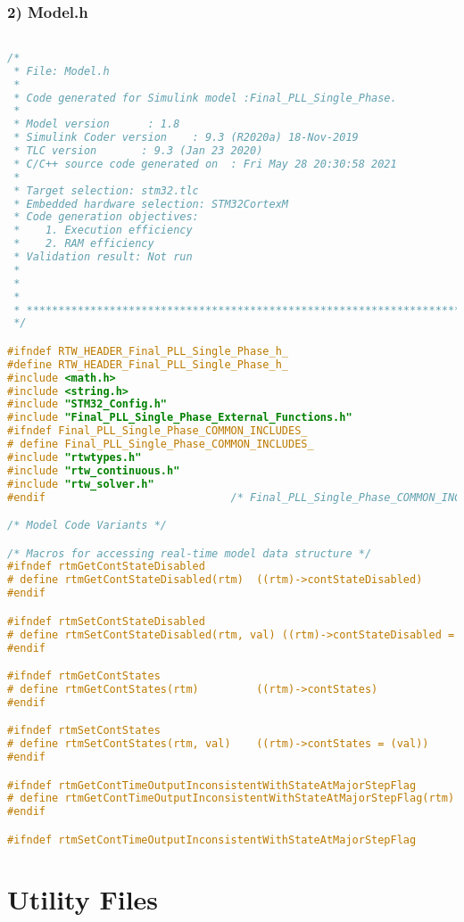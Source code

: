 \subsubsection{2) Model.h}
\begin{lstlisting}[language=C,caption=Model.c]

/*
 * File: Model.h
 *
 * Code generated for Simulink model :Final_PLL_Single_Phase.
 *
 * Model version      : 1.8
 * Simulink Coder version    : 9.3 (R2020a) 18-Nov-2019
 * TLC version       : 9.3 (Jan 23 2020)
 * C/C++ source code generated on  : Fri May 28 20:30:58 2021
 *
 * Target selection: stm32.tlc
 * Embedded hardware selection: STM32CortexM
 * Code generation objectives:
 *    1. Execution efficiency
 *    2. RAM efficiency
 * Validation result: Not run
 *
 *
 *
 * ******************************************************************************
 */

#ifndef RTW_HEADER_Final_PLL_Single_Phase_h_
#define RTW_HEADER_Final_PLL_Single_Phase_h_
#include <math.h>
#include <string.h>
#include "STM32_Config.h"
#include "Final_PLL_Single_Phase_External_Functions.h"
#ifndef Final_PLL_Single_Phase_COMMON_INCLUDES_
# define Final_PLL_Single_Phase_COMMON_INCLUDES_
#include "rtwtypes.h"
#include "rtw_continuous.h"
#include "rtw_solver.h"
#endif                             /* Final_PLL_Single_Phase_COMMON_INCLUDES_ */

/* Model Code Variants */

/* Macros for accessing real-time model data structure */
#ifndef rtmGetContStateDisabled
# define rtmGetContStateDisabled(rtm)  ((rtm)->contStateDisabled)
#endif

#ifndef rtmSetContStateDisabled
# define rtmSetContStateDisabled(rtm, val) ((rtm)->contStateDisabled = (val))
#endif

#ifndef rtmGetContStates
# define rtmGetContStates(rtm)         ((rtm)->contStates)
#endif

#ifndef rtmSetContStates
# define rtmSetContStates(rtm, val)    ((rtm)->contStates = (val))
#endif

#ifndef rtmGetContTimeOutputInconsistentWithStateAtMajorStepFlag
# define rtmGetContTimeOutputInconsistentWithStateAtMajorStepFlag(rtm) ((rtm)->CTOutputIncnstWithState)
#endif

#ifndef rtmSetContTimeOutputInconsistentWithStateAtMajorStepFlag

\end{lstlisting}

\newpage

\section{Utility Files}
